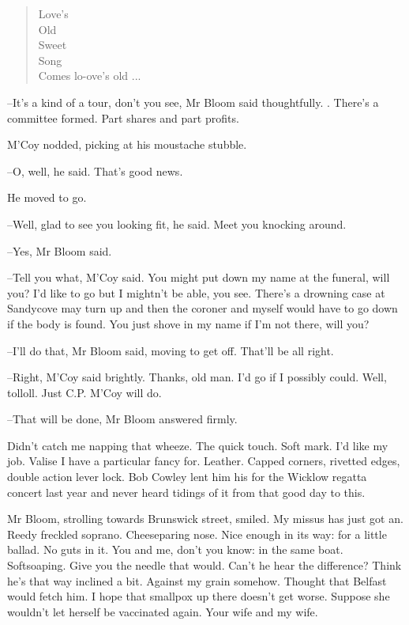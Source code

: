 \begin{verse}
    Love's \\
    Old \\
    Sweet \\
    Song \\
    Comes lo-ove's old ...
\end{verse}


--It's a kind of a tour,
don't you see,
Mr Bloom said thoughtfully.
.
There's a committee formed.
Part shares and part profits.

M'Coy nodded,
picking at his moustache stubble.

--O, well,
he said.
That's good news.

He moved to go.

--Well, glad to see you looking fit,
he said.
Meet you knocking around.

--Yes,
Mr Bloom said.

--Tell you what,
M'Coy said.
You might put down my name at the funeral,
will you?
I'd like to go but I mightn't be able, you see.
There's a drowning case at Sandycove may turn up
and then the coroner and myself would have to go down
if the body is found.
You just shove in my name if I'm not there,
will you?

--I'll do that,
Mr Bloom said,
moving to get off.
That'll be all right.

--Right, M'Coy said brightly.
Thanks, old man.
I'd go if I possibly could.
Well, tolloll.
Just C.P. M'Coy will do.

--That will be done,
Mr Bloom answered firmly.

Didn't catch me napping that wheeze.
The quick touch.
Soft mark.
I'd like my job.
Valise I have a particular fancy for.
Leather.
Capped corners,
rivetted edges,
double action lever lock.
Bob Cowley lent him his for the Wicklow regatta concert last year
and never heard tidings of it from that good day to this.

Mr Bloom, strolling towards Brunswick street, smiled.
My missus has just got an.
Reedy freckled soprano.
Cheeseparing nose.
Nice enough in its way: for a little ballad.
No guts in it.
You and me, don't you know:
in the same boat.
Softsoaping.
Give you the needle that would.
Can't he hear the difference?
Think he's that way inclined a bit.
Against my grain somehow.
Thought that Belfast would fetch him.
I hope that smallpox up there doesn't get worse.
Suppose she wouldn't let herself be vaccinated again.
Your wife and my wife.

